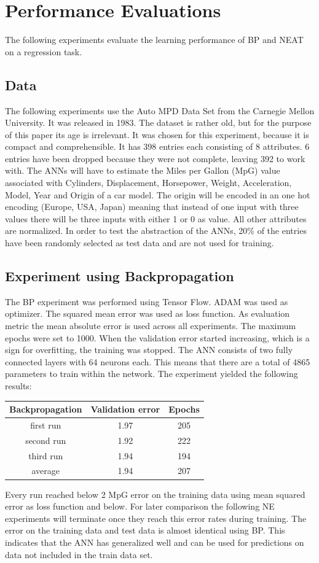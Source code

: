 \documentclass{llncs}
\begin{document}
\section{Performance Evaluations}
%
The following experiments evaluate the learning performance of BP and NEAT on a regression task.
%
\subsection{Data }
%
The following experiments use the Auto MPD Data Set from the Carnegie Mellon University. It was released in 1983. The dataset is rather old, but for the purpose of this paper its age is irrelevant. It was chosen for this experiment, because it is compact and comprehensible. It has 398 entries each consisting of 8 attributes. 6 entries have been dropped because they were not complete, leaving 392 to work with. The ANNs will have to estimate the Miles per Gallon (MpG) value associated with Cylinders, Displacement, Horsepower, Weight, Acceleration, Model, Year and Origin of a car model. The origin will be encoded in an one hot encoding (Europe, USA, Japan) meaning that instead of one input with three values there will be three inputs with either 1 or 0 as value. All other attributes are normalized. In order to test the abstraction of the ANNs, 20\% of the entries have been randomly selected as test data and are not used for training.  
%
\subsection{Experiment using Backpropagation }
%
The BP experiment was performed using Tensor Flow. ADAM was used as optimizer. The squared mean error was  used as loss function.  As evaluation metric the mean absolute error is used across all experiments. The maximum epochs were set to 1000. When the validation error started increasing, which is a sign for overfitting, the training was stopped. The ANN consists of two fully connected layers with 64 neurons each. This means that there are a total of 4865 parameters to train within the network.
%
The experiment yielded the following results:
%
\begin{center}
	\begin{tabular}{ | c | c| c | } 
		\hline
		Backpropagation & Validation error & Epochs \\ 
		\hline
		first run & 1.97   & 205 \\ 
		\hline
		second run & 1.92 & 222 \\ 
		\hline
		third run & 1.94 & 194 \\ 
		\hline
		average & 1.94 & 207 \\ 
		\hline
	\end{tabular}
\end{center}
%
Every run reached below 2 MpG error on the training data using mean squared error as loss function and below. For later comparison the following NE experiments will terminate once they reach this error rates during training. The error on the training data and test data is almost identical using BP. This indicates that the ANN has generalized well and can be used for predictions on data not included in the train data set. 
%
\end{document}
